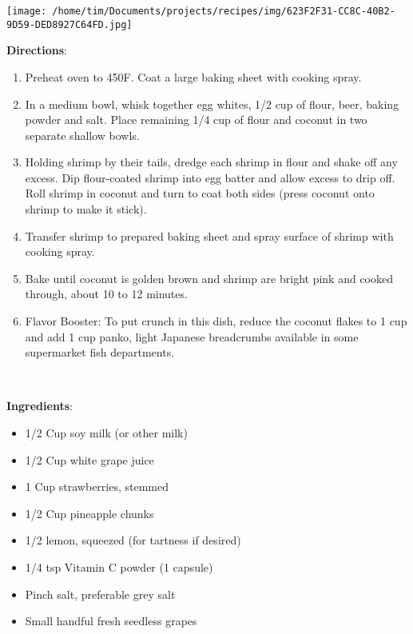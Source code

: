 \documentclass[11pt, twoside, openany]{book}
\begin{document}
\begin{minipage}[t]{0.2\linewidth}
\centering \strut\vspace*{-\baselineskip}\newline
\texttt{[image: /home/tim/Documents/projects/recipes/img/623F2F31-CC8C-40B2-9D59-DED8927C64FD.jpg]}\\
\end{minipage}\vspace{3mm}
\textbf{Directions}:
\vspace{-3mm}\begin{enumerate}\setlength\itemsep{-1mm}
\item Preheat oven to 450F. Coat a large baking sheet with cooking spray.
\item In a medium bowl, whisk together egg whites, 1/2 cup of flour, beer, baking powder and salt. Place remaining 1/4 cup of flour and coconut in two separate shallow bowls.
\item Holding shrimp by their tails, dredge each shrimp in flour and shake off any excess. Dip flour-coated shrimp into egg batter and allow excess to drip off. Roll shrimp in coconut and turn to coat both sides (press coconut onto shrimp to make it stick).
\item Transfer shrimp to prepared baking sheet and spray surface of shrimp with cooking spray.
\item Bake until coconut is golden brown and shrimp are bright pink and cooked through, about 10 to 12 minutes.
\item Flavor Booster: To put crunch in this dish, reduce the coconut flakes to 1 cup and add 1 cup panko, light Japanese breadcrumbs available in some supermarket fish departments.
\end{enumerate}
 \label{fresh-fruit-smoothie}\hfill\textit{}\\
\begin{minipage}[t]{0.8\linewidth}
\textbf{Ingredients}:\vspace{-3mm}
\begin{multicols}{2}
\begin{itemize}\setlength\itemsep{-1mm}
\item 1/2 Cup soy milk (or other milk)
\item 1/2 Cup white grape juice
\item 1 Cup strawberries, stemmed
\item 1/2 Cup pineapple chunks
\item 1/2 lemon, squeezed (for tartness if desired)
\item 1/4 tsp Vitamin C powder (1 capsule)
\item Pinch salt, preferable grey salt
\item Small handful fresh seedless grapes
\end{itemize}
\end{multicols}
\end{minipage}
\end{document}
